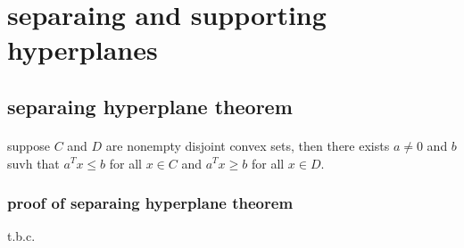 \documentclass{article}
\begin{document}
\section{separaing and supporting hyperplanes}
  \subsection{separaing hyperplane theorem}
    \paragraph{} suppose $C$ and $D$ are nonempty disjoint convex sets, then there exists $a \neq 0$ and $b$ suvh that $a^Tx \leq b$ for all $x \in C$ and $a^Tx \ge b$ for all $x \in D$.
    \subsubsection{proof of separaing hyperplane theorem}
      t.b.c.
\end{document}
